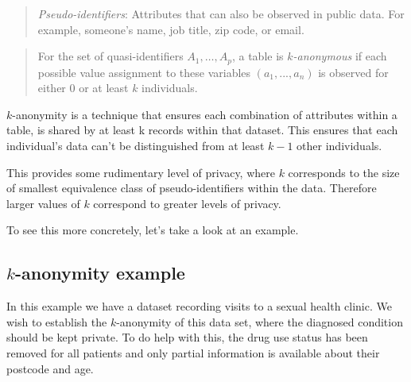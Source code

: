 \documentclass[
  12pt,
]{book}
\begin{document}
\begin{quote}
\emph{Pseudo-identifiers}: Attributes that can also be observed in public data. For
example, someone's name, job title, zip code, or email.
\end{quote}

\begin{quote}
For the set of quasi-identifiers \(A_1, \ldots ,A_p\), a table is
\emph{\(k\)-anonymous} if each possible value assignment to these
variables \((a_1, . . . , a_n)\) is observed for either 0 or at least \(k\) individuals.
\end{quote}

\(k\)-anonymity is a technique that ensures each combination of attributes within a table, is shared by at least k records within that dataset. This ensures that each individual's data can't be distinguished from at least \(k-1\) other individuals.

This provides some rudimentary level of privacy, where \(k\) corresponds to the size of smallest equivalence class of pseudo-identifiers within the data. Therefore larger values of \(k\) correspond to greater levels of privacy.

To see this more concretely, let's take a look at an example.

\hypertarget{k-anonymity-example}{%
\subsection{\texorpdfstring{\(k\)-anonymity example}{k-anonymity example}}\label{k-anonymity-example}}

In this example we have a dataset recording visits to a sexual health clinic. We wish to establish the \(k\)-anonymity of this data set, where the diagnosed condition should be kept private. To do help with this, the drug use status has been removed for all patients and only partial information is available about their postcode and age.
\end{document}
